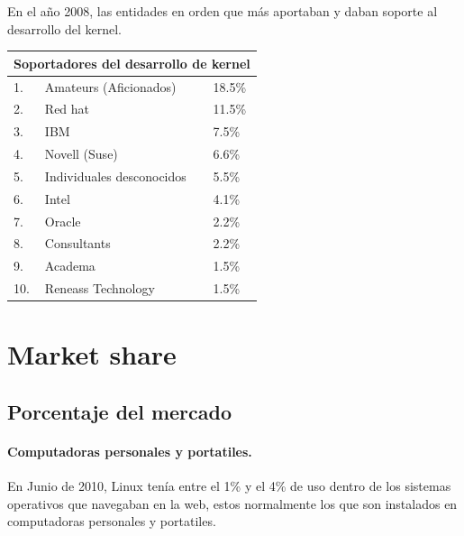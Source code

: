\documentclass[spanish]{article}
\begin{document}
En el a\~{n}o 2008, las entidades en orden que m\'{a}s aportaban y daban soporte al desarrollo del kernel.
\begin{center}
\begin{tabular}{|l l l|}
  \hline
  \multicolumn{3}{|c|}{Soportadores del desarrollo de kernel} \\
  \hline
  1. & Amateurs (Aficionados) & 18.5\%\\
  2. & Red hat 				  & 11.5\%\\
  3. & IBM 					  & 7.5\%\\
  4. & Novell (Suse)            & 6.6\%\\
  5. & Individuales desconocidos & 5.5\%\\
  6. & Intel 				  & 4.1\%\\
  7. & Oracle 				  & 2.2\%\\
  8. & Consultants 			  & 2.2\%\\
  9. & Academa 				  & 1.5\%\\
  10. & Reneass Technology    & 1.5\%\\
  \hline
\end{tabular}
\end{center}







\section{Market share}

\subsection{Porcentaje del mercado}

\paragraph{Computadoras personales y portatiles.} En Junio de 2010, Linux tenía entre el 1\% \cite{NetMarketShare} y el 4\% \cite{W3C}de uso dentro de los sistemas operativos que navegaban en la web, estos normalmente los que son instalados en computadoras personales y portatiles.
\end{document}
